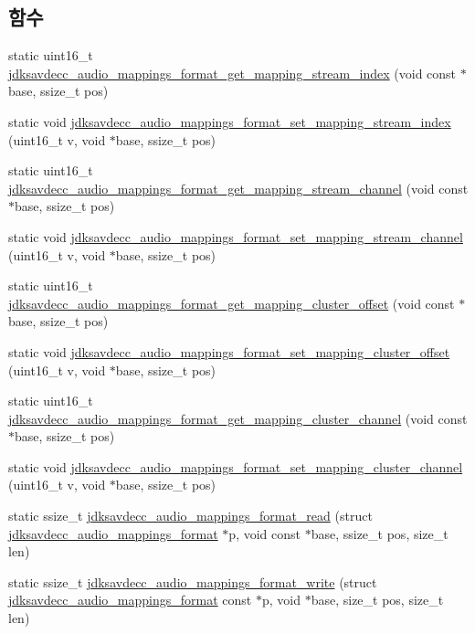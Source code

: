 \subsection*{함수}
\begin{DoxyCompactItemize}
\item 
static uint16\+\_\+t \hyperlink{group__audio__mappings__format_gaf0e2e1d6206477cd3cb45f27c25f024f}{jdksavdecc\+\_\+audio\+\_\+mappings\+\_\+format\+\_\+get\+\_\+mapping\+\_\+stream\+\_\+index} (void const $\ast$base, ssize\+\_\+t pos)
\item 
static void \hyperlink{group__audio__mappings__format_ga864035f94eddc1d440f7368137b91f77}{jdksavdecc\+\_\+audio\+\_\+mappings\+\_\+format\+\_\+set\+\_\+mapping\+\_\+stream\+\_\+index} (uint16\+\_\+t v, void $\ast$base, ssize\+\_\+t pos)
\item 
static uint16\+\_\+t \hyperlink{group__audio__mappings__format_ga0e2304b6d2ebee2269eb0d583d738181}{jdksavdecc\+\_\+audio\+\_\+mappings\+\_\+format\+\_\+get\+\_\+mapping\+\_\+stream\+\_\+channel} (void const $\ast$base, ssize\+\_\+t pos)
\item 
static void \hyperlink{group__audio__mappings__format_gaa09d29b30a940b550b8ca33f33ec185f}{jdksavdecc\+\_\+audio\+\_\+mappings\+\_\+format\+\_\+set\+\_\+mapping\+\_\+stream\+\_\+channel} (uint16\+\_\+t v, void $\ast$base, ssize\+\_\+t pos)
\item 
static uint16\+\_\+t \hyperlink{group__audio__mappings__format_ga66321dd06b3768bc30d0f94eeeb60e78}{jdksavdecc\+\_\+audio\+\_\+mappings\+\_\+format\+\_\+get\+\_\+mapping\+\_\+cluster\+\_\+offset} (void const $\ast$base, ssize\+\_\+t pos)
\item 
static void \hyperlink{group__audio__mappings__format_ga38bb886da4eb67ab05ba5b20c5c5a1fb}{jdksavdecc\+\_\+audio\+\_\+mappings\+\_\+format\+\_\+set\+\_\+mapping\+\_\+cluster\+\_\+offset} (uint16\+\_\+t v, void $\ast$base, ssize\+\_\+t pos)
\item 
static uint16\+\_\+t \hyperlink{group__audio__mappings__format_ga3b0b8e360debc1d76376fb2e045eea60}{jdksavdecc\+\_\+audio\+\_\+mappings\+\_\+format\+\_\+get\+\_\+mapping\+\_\+cluster\+\_\+channel} (void const $\ast$base, ssize\+\_\+t pos)
\item 
static void \hyperlink{group__audio__mappings__format_ga777e2ccdef88d311abffb4ccd193b34c}{jdksavdecc\+\_\+audio\+\_\+mappings\+\_\+format\+\_\+set\+\_\+mapping\+\_\+cluster\+\_\+channel} (uint16\+\_\+t v, void $\ast$base, ssize\+\_\+t pos)
\item 
static ssize\+\_\+t \hyperlink{group__audio__mappings__format_ga8f5dee42add7aad85ccfbf23de25014f}{jdksavdecc\+\_\+audio\+\_\+mappings\+\_\+format\+\_\+read} (struct \hyperlink{structjdksavdecc__audio__mappings__format}{jdksavdecc\+\_\+audio\+\_\+mappings\+\_\+format} $\ast$p, void const $\ast$base, ssize\+\_\+t pos, size\+\_\+t len)
\item 
static ssize\+\_\+t \hyperlink{group__audio__mappings__format_gad165b473114477342d2a15c874770513}{jdksavdecc\+\_\+audio\+\_\+mappings\+\_\+format\+\_\+write} (struct \hyperlink{structjdksavdecc__audio__mappings__format}{jdksavdecc\+\_\+audio\+\_\+mappings\+\_\+format} const $\ast$p, void $\ast$base, size\+\_\+t pos, size\+\_\+t len)
\end{DoxyCompactItemize}



